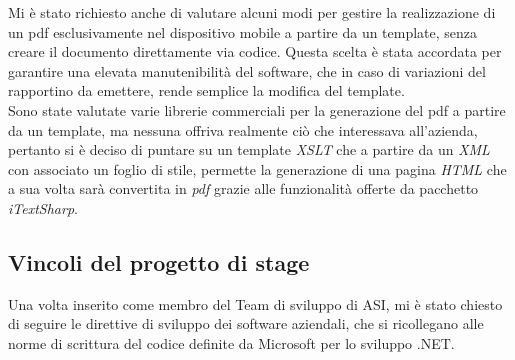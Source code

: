 Mi è stato richiesto anche di valutare alcuni modi per gestire la realizzazione di un pdf esclusivamente nel dispositivo mobile a partire da un template, senza creare il documento direttamente via codice. Questa scelta è stata accordata per garantire una elevata manutenibilità del software, che in caso di variazioni del rapportino da emettere, rende semplice la modifica del template.
\\
Sono state valutate varie librerie commerciali per la generazione del pdf a partire da un template, ma nessuna offriva realmente ciò che interessava all'azienda, pertanto si è deciso di puntare su un template \textit{XSLT} che a partire da un \textit{XML} con associato un foglio di stile, permette la generazione di una pagina \textit{HTML} che a sua volta sarà convertita in \textit{pdf} grazie alle funzionalità offerte da pacchetto \textit{iTextSharp}.

\subsection{Vincoli del progetto di stage}
Una volta inserito come membro del Team di sviluppo di ASI, mi è stato chiesto di seguire le direttive di sviluppo dei software aziendali, che si ricollegano alle norme di scrittura del codice definite da Microsoft per lo sviluppo .NET.

